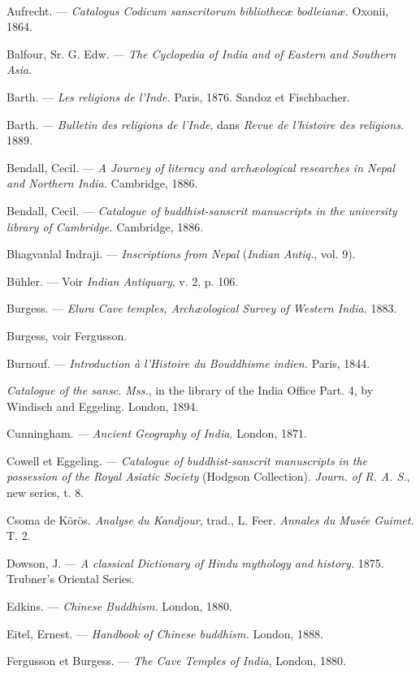 \documentclass[a4paper, 11pt, oneside, french, landscape, twocolumn]{article}
\begin{document}
\paragraph{}
Aufrecht. --- \emph{Catalogus Codicum sanscritorum bibliothecæ bodleianæ.} Oxonii, 1864.

Balfour, Sr. G. Edw. --- \emph{The Cyclopedia of India and of Eastern and Southern Asia.}

Barth. --- \emph{Les religions de l'Inde.} Paris, 1876. Sandoz et Fischbacher.

Barth. --- \emph{Bulletin des religions de l'Inde}, dans \emph{Revue de l'histoire des religions.} 1889.

Bendall, Cecil. --- \emph{A Journey of literacy and archæological researches in Nepal and Northern India.} Cambridge, 1886.

Bendall, Cecil. --- \emph{Catalogue of buddhist-sanscrit manuscripts in the university library of Cambridge.} Cambridge, 1886.

Bhagvanlal Indraji. --- \emph{Inscriptions from Nepal} (\emph{Indian Antiq.}, vol. 9).

Bühler. --- Voir \emph{Indian Antiquary}, v. 2, p. 106.

Burgess. --- \emph{Elura Cave temples, Archæological Survey of Western India.} 1883.

Burgess, voir Fergusson.

Burnouf. --- \emph{Introduction à l'Histoire du Bouddhisme indien.} Paris, 1844.

\emph{Catalogue of the sansc. Mss.}, in the library of the India Office Part. 4, by Windisch and Eggeling. London, 1894.

Cunningham. --- \emph{Ancient Geography of India.} London, 1871.

Cowell et Eggeling. --- \emph{Catalogue of buddhist-sanscrit manuscripts in the possession of the Royal Asiatic Society} (Hodgson Collection). \emph{Journ. of R. A. S.}, new series, t. 8.

Csoma de Körös. \emph{Analyse du Kandjour}, trad., L. Feer. \emph{Annales du Musée Guimet.} T. 2.

Dowson, J. --- \emph{A classical Dictionary of Hindu mythology and history.} 1875. Trubner's Oriental Series.

Edkins. --- \emph{Chinese Buddhism.} London, 1880.

Eitel, Ernest. --- \emph{Handbook of Chinese buddhism.} London, 1888.

Fergusson et Burgess. --- \emph{The Cave Temples of India}, London, 1880.
\end{document}

